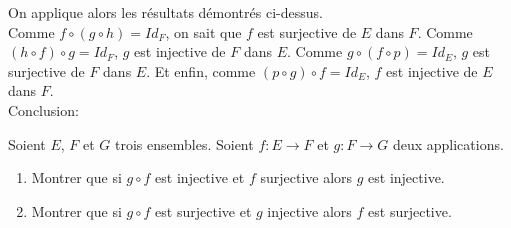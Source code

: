 \documentclass[a4paper, 11pt,reqno]{article}
\begin{document}
\begin{correction}
\begin{enumerate}
		      \noindent On applique alors les r\'esultats d\'emontr\'es ci-dessus.\\
		      \noindent  Comme $f\circ (g\circ h)=Id_F$, on sait que $f$ est surjective de $E$ dans $F$. Comme $(h\circ f)\circ g=Id_F$, $g$ est injective de $F$
		      dans $E$. Comme $g\circ (f\circ p)=Id_E$, $g$ est surjective de $F$ dans $E$. Et enfin, comme $(p\circ g)\circ f=Id_E$, $f$ est injective
		      de $E$ dans $F$. \\
		      \noindent Conclusion: 
	\end{enumerate}
\end{correction}


\begin{exercice}   \;
	Soient $E$, $F$ et $G$ trois ensembles. Soient $f: E\rightarrow F$ et $g: F\rightarrow G$ deux applications.
	\begin{enumerate}
		\item Montrer que si $g\circ f$ est injective et $f$ surjective alors $g$ est injective.
		\item Montrer que si $g\circ f$ est surjective et $g$ injective alors $f$ est surjective.
	\end{enumerate}
\end{exercice}
\end{document}
